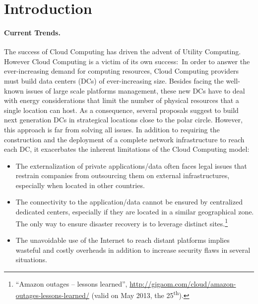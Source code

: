 \section{Introduction\label{sec:intro}}

\paragraph{Current Trends.}
The success of Cloud Computing has driven the advent of Utility Computing.  However Cloud
Computing is a victim of its own success:~In order to answer the ever-increasing demand
for computing resources, Cloud Computing providers must build data centers (DCs) of
ever-increasing size.  Besides facing the well-known issues of large scale platforms
management, these new DCs have to deal with energy considerations that limit the number of
physical resources that a single location can host. As a consequence, several proposals
suggest to build next generation DCs in strategical locations close to the polar circle.
However, this approach is far from solving all issues. In addition to requiring the
construction and the deployment of a complete network infrastructure to reach each DC, it
exacerbates the inherent limitations of the Cloud Computing model:
\begin{itemize}
\item The externalization of private applications/data often faces legal issues that
  restrain companies from outsourcing them on external infrastructures, especially when
  located in other countries.
\item The connectivity to the application/data cannot be ensured by centralized dedicated
  centers, especially if they are located in a similar geographical zone. The only way to
  ensure disaster recovery is to leverage distinct sites.\footnote{“Amazon outages –
    lessons learned”,
    \href{http://gigaom.com/cloud/amazon-outages-lessons-learned/}{http://gigaom.com/cloud/amazon-outages-lessons-learned/}
    (valid on May 2013, the 25\textsuperscript{th}).}
\item The unavoidable use of the Internet to reach
distant platforms implies wasteful and costly overheads in addition to increase security flaws in several situations.
\end{itemize}


